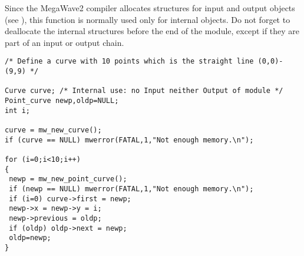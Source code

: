 Since the MegaWave2 compiler allocates structures for input and output 
objects (see \volI), this function is normally used only for internal objects.
Do not forget to deallocate the internal structures before the end
of the module, except if they are part of an input or output chain.

\Next
\Example
\begin{verbatim}
/* Define a curve with 10 points which is the straight line (0,0)-(9,9) */

Curve curve; /* Internal use: no Input neither Output of module */
Point_curve newp,oldp=NULL;
int i;

curve = mw_new_curve();
if (curve == NULL) mwerror(FATAL,1,"Not enough memory.\n");

for (i=0;i<10;i++)
{
 newp = mw_new_point_curve();
 if (newp == NULL) mwerror(FATAL,1,"Not enough memory.\n");
 if (i=0) curve->first = newp;
 newp->x = newp->y = i;
 newp->previous = oldp;
 if (oldp) oldp->next = newp;
 oldp=newp;
} 
\end{verbatim}
\newpage %

